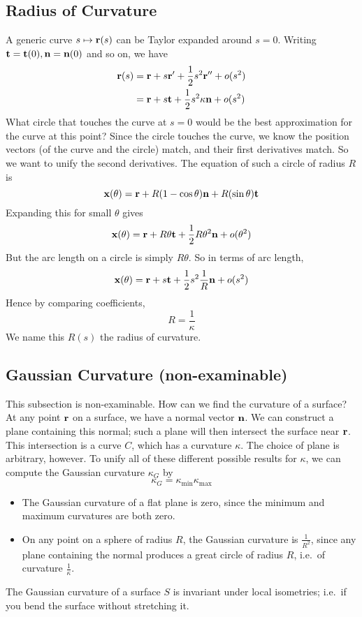 \subsection{Radius of Curvature}
A generic curve \(s \mapsto \vb r(s)\) can be Taylor expanded around \(s=0\).
Writing \(\vb t = \vb t(0), \vb n = \vb n(0)\) and so on, we have
\begin{align*}
	\vb r(s) & = \vb r + s\vb r' + \frac{1}{2}s^2 \vb r'' + o(s^2)    \\
	         & = \vb r + s\vb t + \frac{1}{2}s^2 \kappa\vb n + o(s^2)
\end{align*}
What circle that touches the curve at \(s=0\) would be the best approximation for the curve at this point? Since the circle touches the curve, we know the position vectors (of the curve and the circle) match, and their first derivatives match.
So we want to unify the second derivatives.
The equation of such a circle of radius \(R\) is
\[
	\vb x(\theta) = \vb r + R(1 - \cos \theta)\vb n + R(\sin \theta) \vb t
\]
Expanding this for small \(\theta\) gives
\[
	\vb x(\theta) = \vb r + R\theta\vb t + \frac{1}{2} R\theta^2\vb n + o(\theta^2)
\]
But the arc length on a circle is simply \(R\theta\).
So in terms of arc length,
\[
	\vb x(\theta) = \vb r + s\vb t + \frac{1}{2} s^2 \frac{1}{R}\vb n + o(s^2)
\]
Hence by comparing coefficients,
\[
	R = \frac{1}{\kappa}
\]
We name this \(R(s)\) the radius of curvature.

\subsection{Gaussian Curvature (non-examinable)}
This subsection is non-examinable.
How can we find the curvature of a surface? At any point \(\vb r\) on a surface, we have a normal vector \(\vb n\).
We can construct a plane containing this normal; such a plane will then intersect the surface near \(\vb r\).
This intersection is a curve \(C\), which has a curvature \(\kappa\).
The choice of plane is arbitrary, however.
To unify all of these different possible results for \(\kappa\), we can compute the Gaussian curvature \(\kappa_G\) by
\[
	\kappa_G = \kappa_{\text{min}} \kappa_{\text{max}}
\]
\begin{itemize}
	\item The Gaussian curvature of a flat plane is zero, since the minimum and maximum curvatures are both zero.
	\item On any point on a sphere of radius \(R\), the Gaussian curvature is \(\frac{1}{R^2}\), since any plane containing the normal produces a great circle of radius \(R\), i.e.\ of curvature \(\frac{1}{\kappa}\).
\end{itemize}

\begin{theorem}
	The Gaussian curvature of a surface \(S\) is invariant under local isometries; i.e.\ if you bend the surface without stretching it.
\end{theorem}
